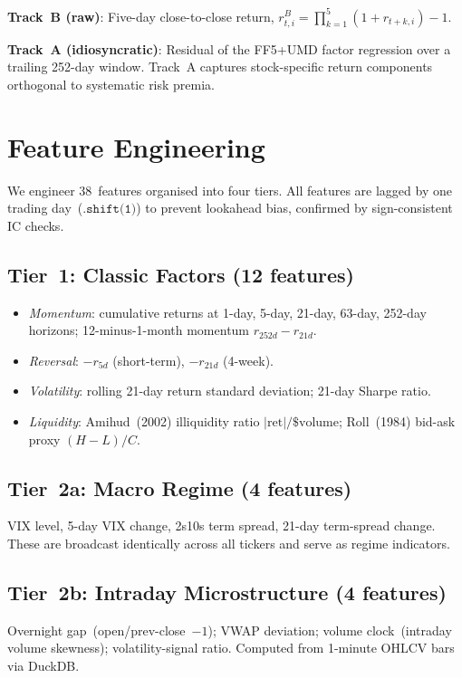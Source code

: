 \documentclass[journal]{IEEEtran}
\begin{document}
\noindent\textbf{Track~B (raw)}: Five-day close-to-close return,
$r^B_{t,i} = \prod_{k=1}^{5}(1+r_{t+k,i})-1$.

\noindent\textbf{Track~A (idiosyncratic)}: Residual of the FF5+UMD
factor regression over a trailing 252-day window.
Track~A captures stock-specific return components orthogonal to
systematic risk premia.

\section{Feature Engineering}
\label{sec:features}

We engineer 38~features organised into four tiers.
All features are lagged by one trading day~($\texttt{.shift(1)}$)
to prevent lookahead bias, confirmed by sign-consistent IC checks.

\subsection{Tier~1: Classic Factors (12 features)}
\begin{itemize}
  \item \emph{Momentum}: cumulative returns at 1-day, 5-day, 21-day,
        63-day, 252-day horizons; 12-minus-1-month momentum
        $r_{252d}-r_{21d}$.
  \item \emph{Reversal}: $-r_{5d}$ (short-term), $-r_{21d}$ (4-week).
  \item \emph{Volatility}: rolling 21-day return standard deviation;
        21-day Sharpe ratio.
  \item \emph{Liquidity}: Amihud~(2002) illiquidity ratio
        $|\text{ret}|/\$\text{volume}$; Roll~(1984) bid-ask proxy
        $(H-L)/C$.
\end{itemize}

\subsection{Tier~2a: Macro Regime (4 features)}
VIX level, 5-day VIX change, 2s10s term spread, 21-day
term-spread change.
These are broadcast identically across all tickers and serve as
regime indicators.

\subsection{Tier~2b: Intraday Microstructure (4 features)}
Overnight gap~(open/prev-close~$-1$); VWAP deviation; volume
clock~(intraday volume skewness); volatility-signal ratio.
Computed from 1-minute OHLCV bars via DuckDB.
\end{document}

